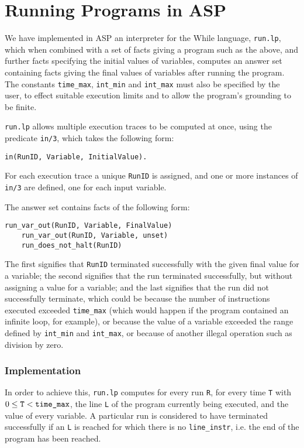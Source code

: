 \documentclass[a4paper,twoside,notitlepage]{report}
\begin{document}
\section{Running Programs in ASP} \label{sec:runasp}

We have implemented in ASP an interpreter for the While language, 
\verb|run.lp|, which when combined with a set of facts giving a program 
such as the above, and further facts specifying the initial values of 
variables, computes an answer set containing facts giving the final values 
of variables after running the program. The constants \verb|time_max|, 
\verb|int_min| and \verb|int_max| must also be specified by the user, to 
effect suitable execution limits and to allow the program's grounding to 
be finite.

\verb|run.lp| allows multiple execution traces to be computed at once, 
using the predicate \verb|in/3|, which takes the following form:
\begin{Verbatim}[samepage=true]
    in(RunID, Variable, InitialValue).
\end{Verbatim}
For each execution trace a unique \verb|RunID| is assigned, and one or 
more instances of \verb|in/3| are defined, one for each input variable.

The answer set contains facts of the following form:
\begin{Verbatim}[samepage=true]
    run_var_out(RunID, Variable, FinalValue)
    run_var_out(RunID, Variable, unset)
    run_does_not_halt(RunID)
\end{Verbatim}

The first signifies that \verb|RunID| terminated successfully with the 
given final value for a variable; the second signifies that the run 
terminated successfully, but without assigning a value for a variable; and 
the last signifies that the run did not successfully terminate, which 
could be because the number of instructions executed exceeded 
\verb|time_max| (which would happen if the program contained an infinite 
loop, for example), or because the value of a variable exceeded the range 
defined by \verb|int_min| and \verb|int_max|, or because of another 
illegal operation such as division by zero.

\subsubsection{Implementation}

In order to achieve this, \verb|run.lp| computes for 
every run \verb|R|, for every time \verb|T| with $0 \leq \verb|T| < 
\verb|time_max|$, the line \verb|L| of the program currently being 
executed, and the value of every variable. A particular run is considered 
to have terminated successfully if an \verb|L| is reached for which there 
is no \verb|line_instr|, i.e. the end of the program has been reached.
\end{document}
